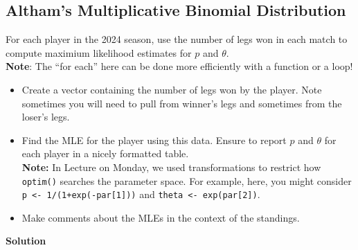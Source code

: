 \documentclass[
]{article}
\providecommand{\tightlist}{%
  \setlength{\itemsep}{0pt}\setlength{\parskip}{0pt}}
\begin{document}
\subsection{Altham's Multiplicative Binomial
Distribution}\label{althams-multiplicative-binomial-distribution-1}

For each player in the 2024 season, use the number of legs won in each
match to compute maximium likelihood estimates for \(p\) and
\(\theta\).\\
\textbf{Note}: The ``for each'' here can be done more efficiently with a
function or a loop!

\begin{itemize}
\tightlist
\item
  Create a vector containing the number of legs won by the player. Note
  sometimes you will need to pull from winner's legs and sometimes from
  the loser's legs.
\item
  Find the MLE for the player using this data. Ensure to report \(p\)
  and \(\theta\) for each player in a nicely formatted table.\\
  \textbf{Note:} In Lecture on Monday, we used transformations to
  restrict how \texttt{optim()} searches the parameter space. For
  example, here, you might consider
  \texttt{p\ \textless{}-\ 1/(1+exp(-par{[}1{]}))} and
  \texttt{theta\ \textless{}-\ exp(par{[}2{]})}.
\item
  Make comments about the MLEs in the context of the standings.
\end{itemize}

\textbf{Solution}

\normalsize
\end{document}
